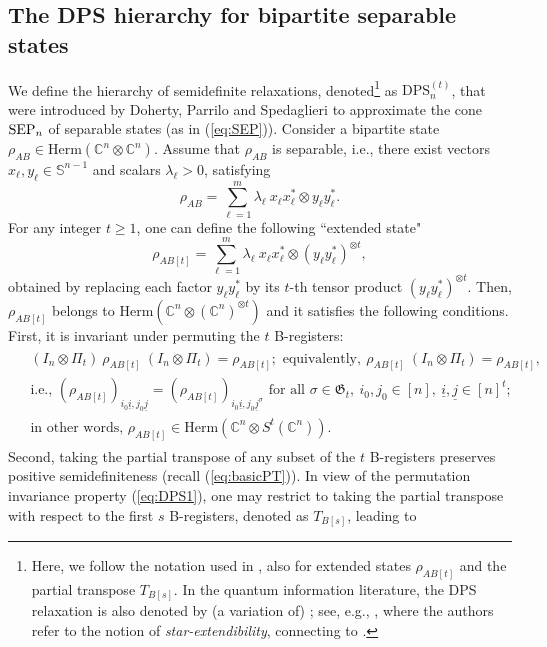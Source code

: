 \documentclass[11pt]{article}
\newcommand{\C}{\ensuremath{\mathbb{C}}} %
\newcommand{\Perm}{\mathfrak G}
\newcommand{\Herm}{\mathrm{Herm}}
\newcommand{\Cnn}{\C^n\ot \C^n}
\newcommand{\Cnnt}{\C^n\ot (\C^n)^{\ot t}}
\newcommand{\sS}{\mathbb S}
\newcommand{\SEP}{\text{\rm SEP}}
\newcommand{\DPSt}{\mathrm{DPS}^{(t)}}
\newcommand{\ot}{\otimes}
\newcommand{\ui}{\underline{i}}
\newcommand{\uj}{\underline{j}}
\theoremstyle{plain}
\begin{document}
\subsection{The DPS hierarchy for bipartite separable states}\label{sec:DPS}

We  define  the hierarchy of semidefinite relaxations, denoted\footnote{Here, we   follow the notation   used in \cite{FF-sphere}, also for extended states $\rho_{AB[t]}$ and the partial transpose $T_{B[s]}$.
In the quantum information literature, the DPS relaxation is also denoted by (a variation of)
; see, e.g., \cite{GNP_2025}, where the authors refer to the notion of {\em star-extendibility}, connecting to \cite{ACGNO_2023}.}
as $\DPSt_n$,  that were introduced by Doherty, Parrilo and Spedaglieri \cite{DPS_2002,DPS_2004} to approximate the cone $\SEP_n$ of separable states (as in (\ref{eq:SEP})). 
Consider a bipartite state $\rho_{AB}\in \Herm(\Cnn)$. Assume that $\rho_{AB}$ is separable, i.e., there exist vectors $x_\ell,y_\ell\in \sS^{n-1}$ and scalars $\lambda_\ell>0$, satisfying 
$$\rho_{AB}=\sum_{\ell=1}^m \lambda_\ell\ x_\ell x_\ell^*\ot y_\ell y_\ell^*.$$
For any integer $t\ge 1$, one can define the following ``extended state" 
$$\rho_{AB[t]}= \sum_{\ell=1}^m \lambda_\ell\ x_\ell x_\ell^*\ot (y_\ell y_\ell^*)^{\ot t},%
$$
obtained by replacing each factor $y_\ell y_\ell^*$ by its $t$-th tensor product $(y_\ell y_\ell^*)^{\ot t}$.
Then, $\rho_{AB[t]}$ belongs to   $\Herm(\Cnnt)$ and it satisfies the following conditions.
First, it is invariant under permuting the  $t$ B-registers:
\begin{align}\label{eq:DPS1}
\begin{split}
& (I_n\ot \Pi_t) \ \rho_{AB[t]} \ (I_n\ot \Pi_t) = \rho_{AB[t]}; \text{  equivalently}, \  \rho_{AB[t]} \ (I_n\ot \Pi_t) = \rho_{AB[t]}, \\
&\text{i.e., } (\rho_{AB[t]})_{i_0\ui,j_0\uj}= (\rho_{AB[t]})_{i_0 \ui,j_0\uj^\sigma} \text{ for all } \sigma \in \Perm_t,\ i_0,j_0\in [n],\ \ui,\uj\in [n]^t;\\
& \text{in other words, } \rho_{AB[t]}\in \Herm(\C^n\ot S^t(\C^n)).
\end{split}\end{align}
Second, taking the partial transpose of any subset of the $t$ B-registers preserves positive semidefiniteness (recall (\ref{eq:basicPT})). In view of the permutation invariance property  (\ref{eq:DPS1}), one may restrict to taking the partial transpose with respect to the first $s$ B-registers, denoted as $T_{B[s]}$, leading to
\end{document}
